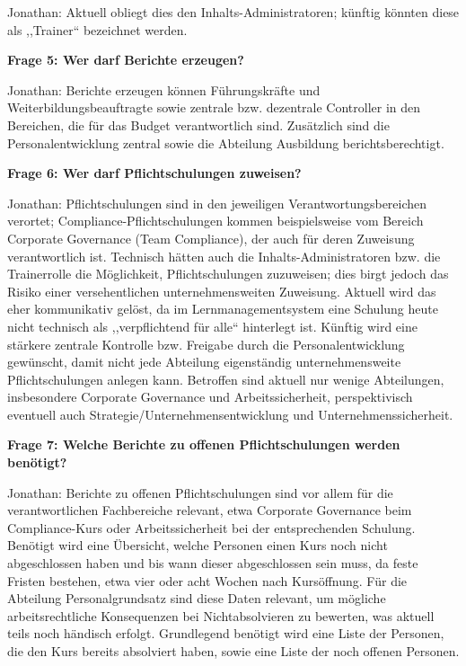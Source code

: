 \documentclass[
    12pt, 
    a4paper,
    ]{scrartcl} %
\begin{document}
Jonathan: Aktuell obliegt dies den Inhalts-Administratoren; k\"unftig k\"onnten diese als ,,Trainer`` bezeichnet werden.

\medskip
\textbf{Frage 5: Wer darf Berichte erzeugen?}

Jonathan: Berichte erzeugen k\"onnen F\"uhrungskr\"afte und Weiterbildungsbeauftragte sowie zentrale bzw. dezentrale Controller in den Bereichen, die f\"ur das Budget verantwortlich sind. Zus\"atzlich sind die Personalentwicklung zentral sowie die Abteilung Ausbildung berichtsberechtigt.

\medskip
\textbf{Frage 6: Wer darf Pflichtschulungen zuweisen?}

Jonathan: Pflichtschulungen sind in den jeweiligen Verantwortungsbereichen verortet; Compliance-Pflichtschulungen kommen beispielsweise vom Bereich Corporate Governance (Team Compliance), der auch f\"ur deren Zuweisung verantwortlich ist. Technisch h\"atten auch die Inhalts-Administratoren bzw. die Trainerrolle die M\"oglichkeit, Pflichtschulungen zuzuweisen; dies birgt jedoch das Risiko einer versehentlichen unternehmensweiten Zuweisung. Aktuell wird das eher kommunikativ gel\"ost, da im Lernmanagementsystem eine Schulung heute nicht technisch als ,,verpflichtend f\"ur alle`` hinterlegt ist. K\"unftig wird eine st\"arkere zentrale Kontrolle bzw. Freigabe durch die Personalentwicklung gew\"unscht, damit nicht jede Abteilung eigenst\"andig unternehmensweite Pflichtschulungen anlegen kann. Betroffen sind aktuell nur wenige Abteilungen, insbesondere Corporate Governance und Arbeitssicherheit, perspektivisch eventuell auch Strategie/Unternehmensentwicklung und Unternehmenssicherheit.

\bigskip
{}

\textbf{Frage 7: Welche Berichte zu offenen Pflichtschulungen werden ben\"otigt?}

Jonathan: Berichte zu offenen Pflichtschulungen sind vor allem f\"ur die verantwortlichen Fachbereiche relevant, etwa Corporate Governance beim Compliance-Kurs oder Arbeitssicherheit bei der entsprechenden Schulung. Ben\"otigt wird eine \"Ubersicht, welche Personen einen Kurs noch nicht abgeschlossen haben und bis wann dieser abgeschlossen sein muss, da feste Fristen bestehen, etwa vier oder acht Wochen nach Kurs\"offnung. F\"ur die Abteilung Personalgrundsatz sind diese Daten relevant, um m\"ogliche arbeitsrechtliche Konsequenzen bei Nichtabsolvieren zu bewerten, was aktuell teils noch h\"andisch erfolgt. Grundlegend ben\"otigt wird eine Liste der Personen, die den Kurs bereits absolviert haben, sowie eine Liste der noch offenen Personen.
\end{document}
